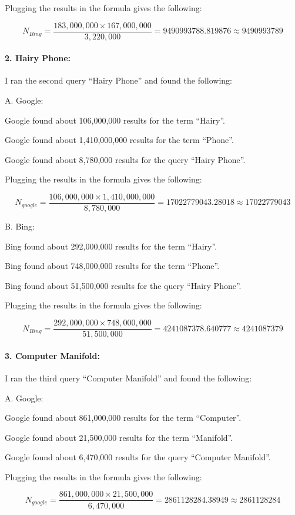 \documentclass[a4paper, 11pt]{article}
\begin{document}
Plugging the results in the formula gives the following:

$$N_{Bing} = \frac{183,000,000 \times 167,000,000}{3,220,000} = 9490993788.819876 \approx 9490993789
$$


\paragraph{2. Hairy Phone:}
I ran the second query ``Hairy Phone'' and found the following:

A. Google:

Google found about 106,000,000 results for the term ``Hairy''.

Google found about 1,410,000,000 results for the term ``Phone''.

Google found about 8,780,000 results for the query ``Hairy Phone''.

Plugging the results in the formula gives the following:

$$N_{google} = \frac{106,000,000 \times 1,410,000,000}{8,780,000} = 17022779043.28018 \approx 17022779043
$$

B. Bing:

Bing found about 292,000,000 results for the term ``Hairy''.

Bing found about 748,000,000 results for the term ``Phone''.

Bing found about 51,500,000 results for the query ``Hairy Phone''.

Plugging the results in the formula gives the following:

$$N_{Bing} = \frac{292,000,000 \times 748,000,000}{51,500,000} = 4241087378.640777 \approx 4241087379
$$

\paragraph{3. Computer Manifold:}
I ran the third query ``Computer Manifold'' and found the following:

A. Google:

Google found about 861,000,000 results for the term ``Computer''.

Google found about 21,500,000 results for the term ``Manifold''.

Google found about 6,470,000 results for the query ``Computer Manifold''.

Plugging the results in the formula gives the following:

$$N_{google} = \frac{861,000,000 \times 21,500,000}{6,470,000} = 2861128284.38949 \approx 2861128284
$$
\end{document}
